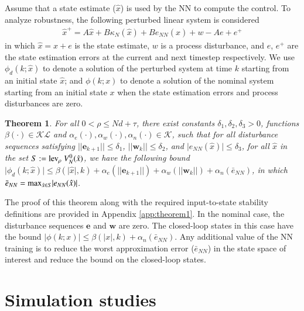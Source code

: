 \documentclass[preprint,5p, twocolumn, authoryear]{elsarticle}
\newtheorem{thm}{Theorem}
\begin{document}
Assume that a state estimate ($\hat{x}$) is
used by the NN to compute the control. 
To analyze robustness, the following perturbed
linear system is considered
\begin{align} \label{eq:perturbed_sys}
    \hat{x}^+ = A\hat{x} + B\kappa_N(\hat{x}) + Be_{NN}(\hat{x}) + w - Ae + e^+
\end{align}
in which $\hat{x} = x + e$ is the state estimate, 
$w$ is a process disturbance, 
and $e$, $e^+$ are the state estimation errors at the 
current and next timestep respectively. 
We use $\phi_d(k;\hat{x})$ to denote a solution of the perturbed system  at time
$k$ starting from an initial state $\hat{x}$; and $\phi(k;x)$ to denote a
solution  of the nominal system starting  from an initial state $x$ when the
state estimation errors and process disturbances are zero.

\begin{thm} \label{thm:nnrobustness}
For all $ 0 < \rho \leq Nd + \tau$, 
there exist constants $\delta_1, \delta_2, \delta_3 > 0$, 
functions $\beta(\cdot) \in \mathcal{K} \mathcal{L}$
and $\alpha_e(\cdot) , \alpha_w(\cdot), \alpha_{n}(\cdot) \in \mathcal{K}$,
such that for all disturbance sequences
satisfying $\vert\vert \mathbf{e}_{k+1} \vert\vert \leq \delta_1$,
$\vert\vert \mathbf{w}_k \vert\vert \leq \delta_2$,
and $\vert e_{NN}(\hat{x}) \vert \leq \delta_3$,
for all $\hat{x}$ in the set $S := \textnormal{lev}_{\rho} \ V_N^0(\hat{x})$,
we have the following bound 
$\vert \phi_d(k; \hat{x}) \vert \leq \beta(\vert \hat{x} \vert, k) 
+ \alpha_e(\vert \vert\mathbf{e}_{k+1} \vert \vert) + 
\alpha_w(\vert \vert \mathbf{w}_k \vert \vert) + 
\alpha_n(\bar{e}_{NN})$, 
in which 
$\bar{e}_{NN} = \textnormal{max}_{\hat{x} \in S} \vert e_{NN}(\hat{x}) \vert$.
\end{thm}

The proof of this theorem along with the required 
input-to-state stability definitions are provided 
in Appendix \ref{app:theorem1}.
In the nominal case, 
the disturbance sequences $\mathbf{e}$ and $\mathbf{w}$ are zero.
The closed-loop states in this case have the bound
$\vert \phi(k; x) \vert \leq \beta(\vert x \vert, k) + 
\alpha_n(\bar{e}_{NN})$. Any additional value of 
the NN training is to reduce the worst 
approximation error ($\bar{e}_{NN}$) 
in the state space of interest and 
reduce the bound on the closed-loop states. 

\section{Simulation studies} \label{sec:simulation_studies}
\end{document}
